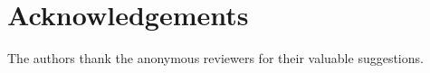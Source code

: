\section*{Acknowledgements}

The authors thank the anonymous reviewers for their valuable suggestions.

